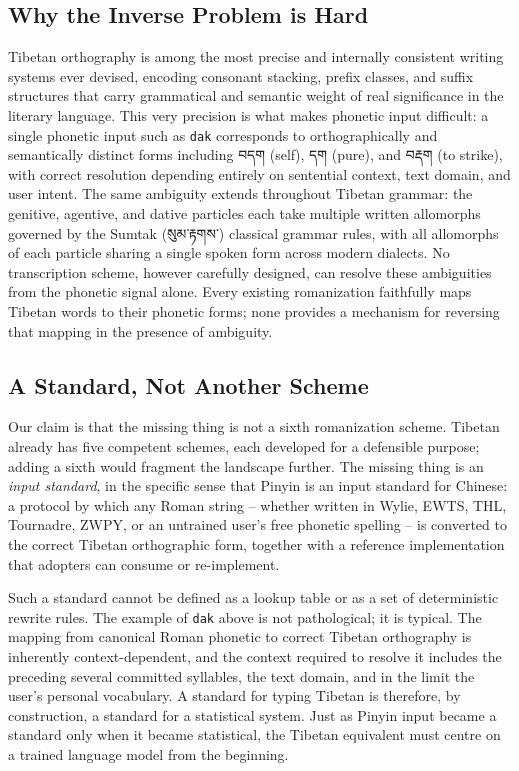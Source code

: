 \documentclass[11pt]{article}
\newcommand{\tib}[1]{{\fontspec{Jomolhari}#1}}
\begin{document}
\subsection{Why the Inverse Problem is Hard}

Tibetan orthography is among the most precise and internally consistent writing systems ever devised, encoding consonant stacking, prefix classes, and suffix structures that carry grammatical and semantic weight of real significance in the literary language. This very precision is what makes phonetic input difficult: a single phonetic input such as \texttt{dak} corresponds to orthographically and semantically distinct forms including \tib{བདག} (self), \tib{དག} (pure), and \tib{བརྡག} (to strike), with correct resolution depending entirely on sentential context, text domain, and user intent. The same ambiguity extends throughout Tibetan grammar: the genitive, agentive, and dative particles each take multiple written allomorphs governed by the Sumtak (\tib{སུམ་རྟགས་}) classical grammar rules, with all allomorphs of each particle sharing a single spoken form across modern dialects. No transcription scheme, however carefully designed, can resolve these ambiguities from the phonetic signal alone. Every existing romanization faithfully maps Tibetan words to their phonetic forms; none provides a mechanism for reversing that mapping in the presence of ambiguity.

\subsection{A Standard, Not Another Scheme}

Our claim is that the missing thing is not a sixth romanization scheme. Tibetan already has five competent schemes, each developed for a defensible purpose; adding a sixth would fragment the landscape further. The missing thing is an \emph{input standard}, in the specific sense that Pinyin is an input standard for Chinese: a protocol by which any Roman string -- whether written in Wylie, EWTS, THL, Tournadre, ZWPY, or an untrained user's free phonetic spelling -- is converted to the correct Tibetan orthographic form, together with a reference implementation that adopters can consume or re-implement.

Such a standard cannot be defined as a lookup table or as a set of deterministic rewrite rules. The example of \texttt{dak} above is not pathological; it is typical. The mapping from canonical Roman phonetic to correct Tibetan orthography is inherently context-dependent, and the context required to resolve it includes the preceding several committed syllables, the text domain, and in the limit the user's personal vocabulary. A standard for typing Tibetan is therefore, by construction, a standard for a statistical system. Just as Pinyin input became a standard only when it became statistical, the Tibetan equivalent must centre on a trained language model from the beginning.
\end{document}
